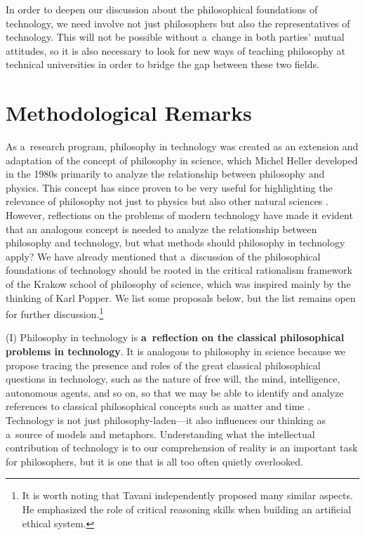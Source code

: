In order to deepen our discussion about the philosophical foundations of technology, we need involve not just philosophers but also the representatives of technology. This will not be possible without a~change in both parties' mutual attitudes, so it is also necessary to look for new ways of teaching philosophy at technical universities in order to bridge the gap between these two fields.



\section{Methodological Remarks}

As a~research program, philosophy in technology was created as an extension and adaptation of the concept of philosophy in science, which Michel Heller developed in the 1980s primarily to analyze the relationship between philosophy and physics. This concept has since proven to be very useful for highlighting the relevance of philosophy not just to physics but also other natural sciences 
\parencites[e.g][]{brozek_philosophy_2011}[][]{polak_oblicza_2017}. %
 However, reflections on the problems of modern technology have made it evident that an analogous concept is needed to analyze the relationship between philosophy and technology, but what methods should philosophy in technology apply? We have already mentioned that a~discussion of the philosophical foundations of technology should be rooted in the critical rationalism framework of the Krakow school of philosophy of science, which was inspired mainly by the thinking of Karl Popper. We list some proposals below, but the list remains open for further discussion.\footnote{It is worth noting that Tavani 
\parencite*[][]{tavani_ethics_2013} %
 independently proposed many similar aspects. He emphasized the role of critical reasoning skills when building an artificial ethical system.}



(I) Philosophy in technology is \textbf{a~reflection on the classical philosophical problems in technology}. It is analogous to philosophy in science because we propose tracing the presence and roles of the great classical philosophical questions in technology, such as the nature of free will, the mind, intelligence, autonomous agents, and so on, so that we may be able to identify and analyze references to classical philosophical concepts such as matter and time 
\parencite[e.g][]{}. %
 Technology is not just philosophy-laden---it also influences our thinking as a~source of models and metaphors. Understanding what the intellectual contribution of technology is to our comprehension of reality is an important task for philosophers, but it is one that is all too often quietly overlooked.



